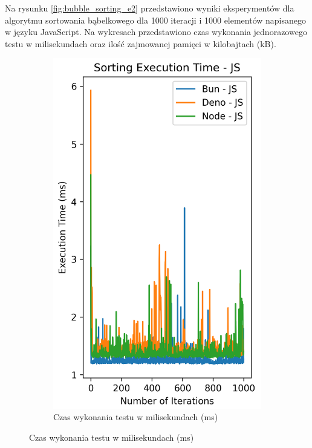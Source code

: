 Na rysunku \ref{fig:bubble_sorting_e2} przedstawiono wyniki eksperymentów dla algorytmu sortowania bąbelkowego dla 1000 iteracji i 1000 elementów napisanego w języku JavaScript. Na wykresach przedstawiono czas wykonania jednorazowego testu w milisekundach oraz ilość zajmowanej pamięci w kilobajtach (kB).

\begin{figure}[H]
  \centering
  \begin{subfigure}[b]{0.42\textwidth}
    \centering
    \includegraphics[width=\textwidth]{Figures/sorting/sorting_bubble_1000_1000_js_time.png}
    \caption{Czas wykonania testu w milisekundach (ms)}

\end{subfigure}
\end{figure}
